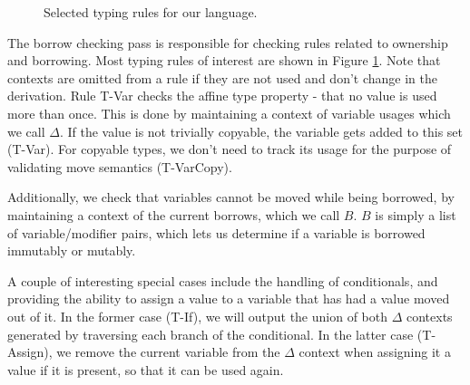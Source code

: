 \documentclass[letterpaper,11pt]{article}
\begin{document}
\begin{figure}
\begin{prooftree}
\end{prooftree}

\begin{prooftree}
\end{prooftree}

    \caption{Selected typing rules for our language.}
    \label{borrowrules}
\end{figure}

The borrow checking pass is responsible for checking rules related to ownership
and borrowing. Most typing rules of interest are shown in Figure \ref{borrowrules}. Note that
contexts are omitted from a rule if they are not used and don't change in the derivation.
Rule T-Var checks the affine type property - that no value is used more than once.
This is done by maintaining a context of variable usages which we call $\Delta$. If the value
is not trivially copyable, the variable gets added to this set (T-Var). For copyable types,
we don't need to track its usage for the purpose of validating move semantics (T-VarCopy).

Additionally, we check that variables cannot be moved while being borrowed, by
maintaining a context of the current borrows, which we call $B$. $B$ is simply a list of variable/modifier
pairs, which lets us determine if a variable is borrowed immutably or mutably.

A couple of interesting special cases include the handling of conditionals,
and providing the ability to assign a value to a variable that has had a value
moved out of it. In the former case (T-If), we will output the union of both $\Delta$
contexts generated by traversing each branch of the conditional. In the latter case (T-Assign),
we remove the current variable from the $\Delta$ context when assigning it a value
if it is present, so that it can be used again.
\end{document}
